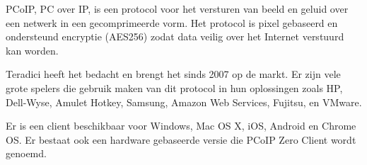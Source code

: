 PCoIP, PC over IP, is een protocol voor het versturen van beeld en geluid over een netwerk in een gecomprimeerde vorm. Het protocol is pixel gebaseerd en ondersteund encryptie (AES256) zodat data veilig over het Internet verstuurd kan worden.

Teradici heeft het bedacht en brengt het sinds 2007 op de markt. Er zijn vele grote spelers die gebruik maken van dit protocol in hun oplossingen zoals HP, Dell-Wyse, Amulet Hotkey, Samsung, Amazon Web Services, Fujitsu, en VMware. 

Er is een client beschikbaar voor Windows, Mac OS X, iOS, Android en Chrome OS. Er bestaat ook een hardware gebaseerde versie die PCoIP Zero Client wordt genoemd.
